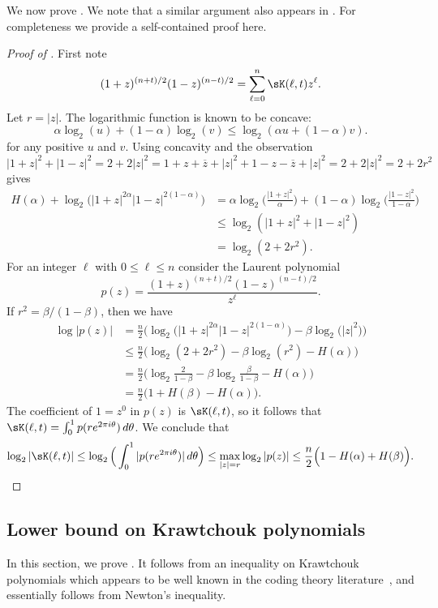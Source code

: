 We now prove .
We note that a similar argument also appears in \cite[Lemma 2.1]{Pol19}.
For completeness we provide a self-contained proof here.
\begin{proof}[Proof of ]
First note
$$
(1+z)^{(n+t)/2}(1-z)^{(n-t)/2}=\sum_{\ell=0}^n
\sK(\ell,t)z^\ell.
$$
Let $r=|z|$. The logarithmic function is known to be concave: 
\[
  \alpha\log_2(u)+(1-\alpha)\log_2(v)\leq \log_2(\alpha u+(1-\alpha) v).
\]
for any positive $u$ and $v$.
Using concavity and the observation   $|1+z|^2+|1-z|^2=2+2|z|^2=1+z+\overline{z}+|z|^2+1-z-\overline{z}+|z|^2=2+2|z|^2=2+2r^2$ gives 
\begin{align*}
  H(\alpha)+\log_2\big(|1+z|^{2\alpha}|1-z|^{2(1-\alpha)}\big)
  &= \alpha\log_2\Big(\frac{|1+z|^2}{\alpha}\Big) + (1-\alpha)\log_2\Big(\frac{|1-z|^2}{1-\alpha}\Big) \\
  &\le \log_2(|1+z|^2+|1-z|^2) \\
  &=\log_2(2+2r^2) .
\end{align*}
For an integer $\ell$ with $0\leq \ell\leq n$
consider the Laurent polynomial 
$$
p(z)=\frac{(1+z)^{(n+t)/2}(1-z)^{(n-t)/2}}{z^\ell}.
$$
If $r^2=\beta/(1-\beta)$, then we have
\begin{align*}
  \log|p(z)|
  &= \frac{n}{2}\Big(\log_2\big(|1+z|^{2\alpha}|1-z|^{2(1-\alpha)}\big)-\beta\log_2\big(|z|^2\big)\Big) \\
  &\leq \frac{n}{2}\Big(\log_2(2+2r^2)-\beta\log_2(r^2)-H(\alpha)\Big) \\
  &= \frac{n}{2}\Big(\log_2\tfrac{2}{1-\beta}-
\beta\log_2\tfrac{\beta}{1-\beta} - H(\alpha)\Big) \\
  &= \frac{n}{2}\Big(1+H(\beta)-H(\alpha)\Big) .
\end{align*}
The coefficient of $1=z^0$ in $p(z)$ is $\sK(\ell,t)$, so it follows that
$\sK(\ell,t)=\int_0^1p(re^{2\pi i \theta})\,d\theta$. We conclude that
\[
\log_2|\sK(\ell,t)|
\le \log_2\Big(\int_0^1 |p(re^{2\pi i\theta})|\,d\theta\Big)
\le \max_{|z|=r}\log_2 |p(z)|
\le\frac{n}{2}\Big(1-H(\alpha)+H(\beta)\Big). \qedhere
\]
\end{proof}

\subsection{Lower bound on Krawtchouk polynomials}

In this section, we prove .
It follows from an inequality on Krawtchouk polynomials which appears to be well known in the coding theory literature~\cite{MRRW77,KL95,Kra01,KS21}, and essentially follows from Newton's inequality.

